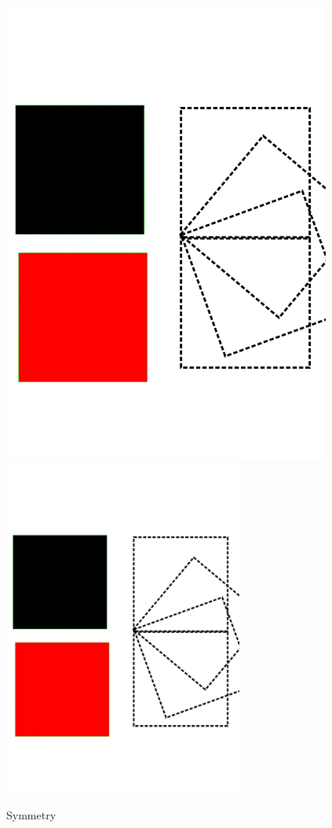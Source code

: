 \begin{figure}[!htbp]
  \begin{center}
    \leavevmode
    \ifpdf
      \includegraphics[height=6in]{Symmetry}
    \else
      \includegraphics[width=0.7\textwidth]{Symmetry}
    \fi
    \caption{Symmetry}
    \label{fig:symmetry}
\end{center}
\end{figure}


